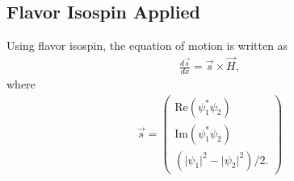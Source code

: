 \documentclass[letterpaper,12pt,english]{sphinxmanual}
\begin{document}
\subsection{Flavor Isospin Applied}
\label{\detokenize{matter-stimulated/flavor-isospin-matter:flavor-isospin-applied}}
Using flavor isospin, the equation of motion is written as
\begin{equation*}
\begin{split}\frac{d\vec s}{dx} = \vec{s} \times \vec H,\end{split}
\end{equation*}
where
\begin{equation*}
\begin{split}\vec s = \begin{pmatrix}
\mathrm{Re}(\psi_1^*\psi_2) \\
\mathrm{Im}(\psi_1^*\psi_2) \\
(\lvert \psi_1 \rvert^2 - \lvert \psi_2 \rvert^2)/2.
\end{pmatrix}\end{split}
\end{equation*}
\end{document}
